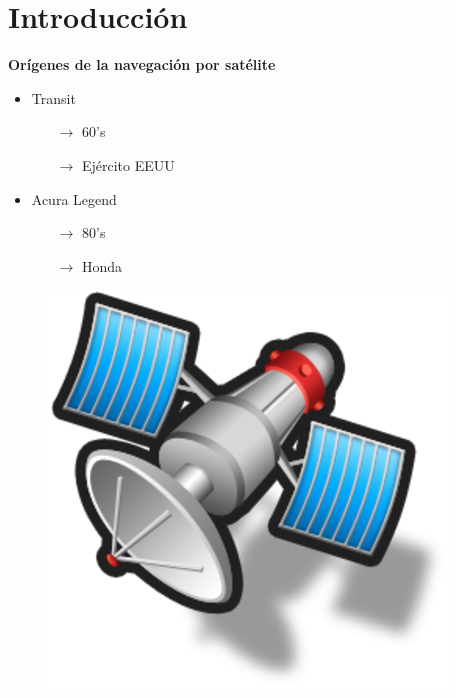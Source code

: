 \section{Introducción}

\begin{slide}
  \begin{block}{\textbf{Orígenes de la navegación por satélite}}
    \begin{minipage}[b]{0.7\linewidth}
      \begin{itemize}
        \item Transit
        \begin{itemize}
          \item[$\rightarrow$] 60's
          \item[$\rightarrow$] Ejército EEUU
        \end{itemize}
        \item<2> Acura Legend
        \begin{itemize}
          \item[$\rightarrow$] 80's
          \item[$\rightarrow$] Honda
        \end{itemize}
      \end{itemize}
    \end{minipage}
    \begin{minipage}[b]{0.2\linewidth}
      \begin{figure}
        \includegraphics[height=0.4\textheight]{img/satellite.png}
      \end{figure}
    \end{minipage}
  \end{block}
\end{slide}

